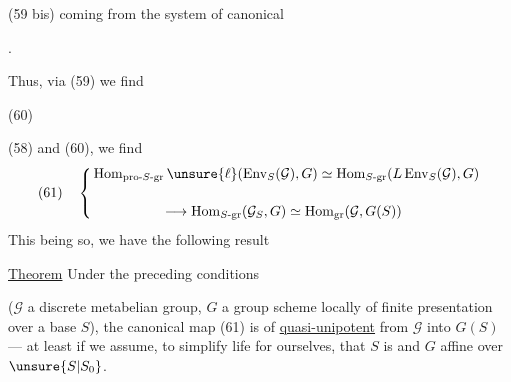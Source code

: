 (59 bis)\quad
{}
coming from the system of canonical 



.

Thus, via (59) we find

(60)\quad
{}


 (58) and (60), we find
\[
(61)\quad\left\{
\begin{aligned}
&\operatorname{Hom}_{\mathrm{pro}\text{-}S\text{-}\mathrm{gr}}\unsure{\ell}
 (\operatorname{Env}_S(\mathcal{G}),G)
 \simeq\operatorname{Hom}_{S\text{-}\mathrm{gr}}(L\operatorname{Env}_S(\mathcal{G}),G)\\[1.2em]
&\hspace{5em}\longrightarrow\operatorname{Hom}_{S\text{-}\mathrm{gr}}(\mathcal{G}_S,G)
 \simeq\operatorname{Hom}_{\mathrm{gr}}(\mathcal{G},G(S))
\end{aligned}\right.
\]
This being so, we have the following result

\uline{Theorem}  Under the preceding conditions

($\mathcal{G}$ a discrete metabelian group, $G$ a group scheme locally of finite presentation over a base  $S$), the canonical map (61) is    of  \uline{quasi-unipotent} from $\mathcal{G}$ into $G(S)$ --- at least if we assume, to simplify life for ourselves, that $S$ is  and $G$ affine over $\unsure{S|S_0}$.

